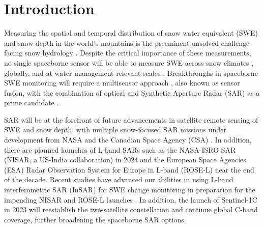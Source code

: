 \hypertarget{ch4-intro}{\section{Introduction}\label{ch4-intro}}

Measuring the spatial and temporal distribution of snow water equivalent (SWE) and snow depth in the world’s mountains is the preeminent unsolved challenge facing snow hydrology \citep{dozierEstimatingSpatialDistribution2016}. Despite the critical importance of these measurements, no single spaceborne sensor will be able to measure SWE across snow climates \citep{sturmSeasonalSnowCover1995, sturmRevisitingGlobalSeasonal2021}, globally, and at water management-relevant scales \citep{lettenmaierInroadsRemoteSensing2015}. Breakthroughs in spaceborne SWE monitoring will require a multisensor approach \citep{durandAchievingBreakthroughsGlobal2021}, also known as sensor fusion, with the combination of optical and Synthetic Aperture Radar (SAR) as a prime candidate \citep{tarriconeEstimatingSnowAccumulation2023a}. 

SAR will be at the forefront of future advancements in satellite remote sensing of SWE and snow depth, with multiple snow-focused SAR missions under development from NASA and the Canadian Space Agency (CSA) \citep{tsangReviewArticleGlobal2022, yuehSatelliteSyntheticAperture2021, garnaudQuantifyingSnowMass2019}. In addition, there are planned launches of L-band SARs such as the NASA-ISRO SAR (NISAR, a US-India collaboration) in 2024 and the European Space Agencies (ESA) Radar Observation System for Europe in L-band (ROSE-L) near the end of the decade. Recent studies have advanced our abilities in using L-band interferometric SAR (InSAR) for SWE change monitoring in preparation for the impending NISAR and ROSE-L launches \citep{tarriconeEstimatingSnowAccumulation2023a, marshallLBandInSARDepth2021, naglerAirborneExperimentInsar2022}. In addition, the launch of Sentinel-1C in 2023 will reestablish the two-satellite constellation and continue global C-band coverage, further broadening the spaceborne SAR options. 

